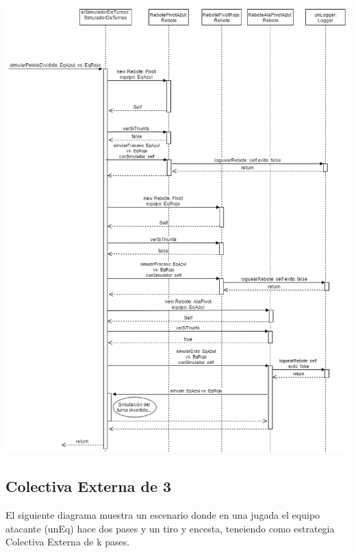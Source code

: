 \includegraphics[width=\textwidth]{imgs/PelotaDivididaSecuencia.png}

\subsection{Colectiva Externa de 3}

El siguiente diagrama muestra un escenario donde en una jugada el equipo atacante (unEq) hace dos pases y un tiro y encesta, teneiendo como estrategia Colectiva Externa de k pases.

